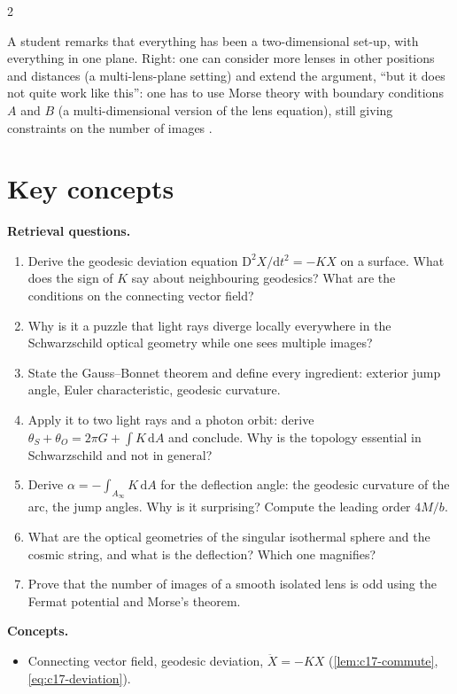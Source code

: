 \begin{paracol}{2}
\begin{coursenote}
A student remarks that everything has been a two-dimensional set-up, with everything in one plane. Right: one can consider more lenses in other positions and distances (a multi-lens-plane setting) and extend the argument, ``but it does not quite work like this'': one has to use Morse theory with boundary conditions $A$ and $B$ (a multi-dimensional version of the lens equation), still giving constraints on the number of images .
\end{coursenote}

\section*{Key concepts}
\begin{keyconcepts}
\textbf{Retrieval questions.}
\begin{enumerate}
  \item Derive the geodesic deviation equation $\mathrm D^2X/\mathrm dt^2=-KX$ on a surface. What does the sign of $K$ say about neighbouring geodesics? What are the conditions on the connecting vector field?
  \item Why is it a puzzle that light rays diverge locally everywhere in the Schwarzschild optical geometry while one sees multiple images?
  \item State the Gauss--Bonnet theorem and define every ingredient: exterior jump angle, Euler characteristic, geodesic curvature.
  \item Apply it to two light rays and a photon orbit: derive $\theta_S+\theta_O=2\pi G+\int K\,\mathrm dA$ and conclude. Why is the topology essential in Schwarzschild and not in general?
  \item Derive $\alpha=-\int_{A_\infty}K\,\mathrm dA$ for the deflection angle: the geodesic curvature of the arc, the jump angles. Why is it surprising? Compute the leading order $4M/b$.
  \item What are the optical geometries of the singular isothermal sphere and the cosmic string, and what is the deflection? Which one magnifies?
  \item Prove that the number of images of a smooth isolated lens is odd using the Fermat potential and Morse's theorem.
\end{enumerate}
\textbf{Concepts.}
\begin{itemize}
  \item Connecting vector field, geodesic deviation, $\ddot X=-KX$ (\cref{lem:c17-commute}, \eqref{eq:c17-deviation}).

\end{itemize}
\end{keyconcepts}
\end{paracol}
